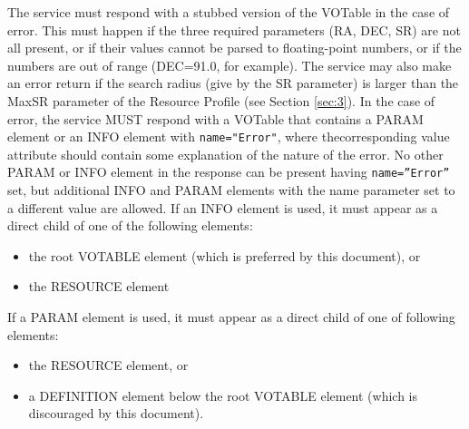 \documentclass[11pt,a4paper]{ivoa}
\begin{document}
The service must respond with a stubbed version of the VOTable in the case
		of error. This must happen if the three required parameters (RA, DEC,
		SR) are not all present, or if their values cannot be parsed to
		floating-point numbers, or if the numbers are out of range (DEC=91.0,
		for example). The service may also make an error return if the search
		radius (give by the SR parameter) is larger than the MaxSR parameter of
		the Resource Profile (see Section \ref{sec:3}). In the case of error,
		the service MUST respond with a VOTable that contains a PARAM element or
		an INFO element with \texttt{name="Error"}, where thecorresponding value
		attribute should contain some explanation of the nature of the error. No
		other PARAM or INFO element in the response can be present having
		\texttt{name=''Error''} set, but additional INFO and PARAM elements with
		the name parameter set to a different value are allowed. If an INFO
		element is used, it must appear as a direct child of one of the
		following elements:
		
		\begin{itemize} 
			\item the root VOTABLE element	(which is preferred by this document), or
			\item the RESOURCE element
		\end{itemize}
		
		If a PARAM element is used, it must appear as a direct
		child of one of following elements:
		
		\begin{itemize}
			\item the RESOURCE element, or
			\item a DEFINITION element below the root VOTABLE element
				(which is discouraged by this document).
		\end{itemize}
\end{document}
